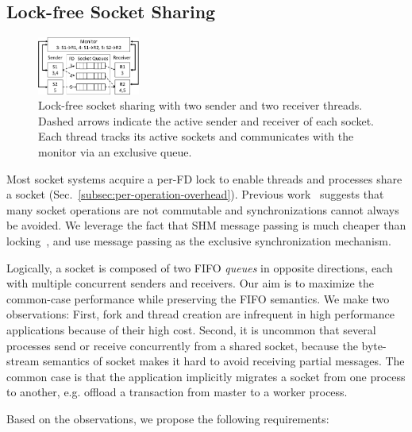\subsection{Lock-free Socket Sharing}
\label{subsec:fork}


\begin{figure}[t!]
	\centering
	\includegraphics[width=0.3\textwidth]{images/queue_arch}
	\vspace{-5pt}
	\caption{Lock-free socket sharing with two sender and two receiver threads. Dashed arrows indicate the active sender and receiver of each socket. Each thread tracks its active sockets and communicates with the monitor via an exclusive queue.}
	\label{fig:queue-arch}
\end{figure}

Most socket systems acquire a per-FD lock to enable threads and processes share a socket (Sec.~\ref{subsec:per-operation-overhead}).
Previous work~\cite{boyd2010analysis,clements2015scalable} suggests that many socket operations are not commutable and synchronizations cannot always be avoided.
We leverage the fact that SHM message passing is much cheaper than locking~\cite{roghanchi2017ffwd}, and use message passing as the exclusive synchronization mechanism.

Logically, a socket is composed of two FIFO \emph{queues} in opposite directions, each with multiple concurrent senders and receivers.
Our aim is to maximize the common-case performance while preserving the FIFO semantics.
We make two observations: First, fork and thread creation are infrequent in high performance applications because of their high cost.
Second, it is uncommon that several processes send or receive concurrently from a shared socket, because the byte-stream semantics of socket makes it hard to avoid receiving partial messages.
The common case is that the application implicitly migrates a socket from one process to another, e.g. offload a transaction from master to a worker process.

\iffalse
Based on the observations, we propose the following requirements:

